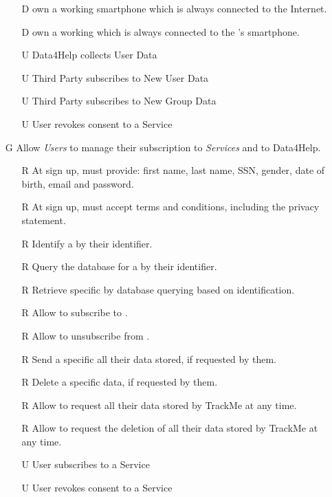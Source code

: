 \documentclass[../../../rasd.tex]{subfiles}
\begin{document}
\begin{itemize}
\begin{itemize}
        \item[D\subs{10}] own a working smartphone which is always connected to the Internet.
        \item[D\subs{11}] own a working  which is always connected to the 's smartphone.
        \\
        \item[U\subs{5}]Data4Help collects User Data
        \item[U\subs{8}]Third Party subscribes to New User Data
        \item[U\subs{9}]Third Party subscribes to New Group Data
        \item[U\subs{11}]User revokes consent to a Service
    \end{itemize}

    \item[G\subs{5}]Allow \textit{Users} to manage their subscription to \textit{Services} and to Data4Help.
    \begin{itemize}
    \item[R\subs{2}]At sign up,  must provide: first name, last name, SSN, gender, date of birth, email and password.
        \item[R\subs{4}]At sign up,  must accept terms and conditions, including the privacy statement.
        \item[R\subs{6}]Identify a  by their identifier.
        \item[R\subs{7}]Query the database for a  by their identifier.
        \item[R\subs{12}]Retrieve specific  by database querying based on  identification.
        \item[R\subs{30}]Allow  to subscribe to .
        \item[R\subs{31}]Allow  to unsubscribe from .
        \item[R\subs{32}]Send a specific  all their data stored, if requested by them.
        \item[R\subs{33}]Delete a  specific data, if requested by them.
        \item[R\subs{34}]Allow  to request all their data stored by TrackMe at any time.
        \item[R\subs{35}]Allow  to request the deletion of all their data stored by TrackMe at any time.
        \\
        \item[U\subs{10}]User subscribes to a Service
        \item[U\subs{11}]User revokes consent to a Service
    \end{itemize}
\end{itemize}
\end{document}
